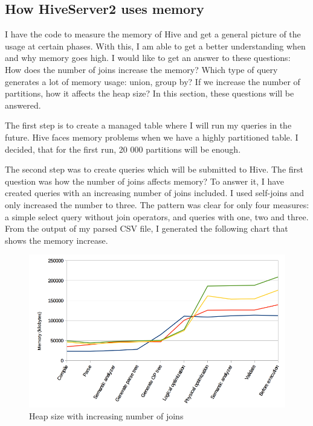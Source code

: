 \subsection{How HiveServer2 uses memory}
I have the code to measure the memory of Hive and get a general picture of the usage at certain phases. With this, I am able to get a better understanding when and why memory goes high. I would like to get an answer to these questions: How does the number of joins increase the memory? Which type of query generates a lot of memory usage: union, group by? If we increase the number of partitions, how it affects the heap size? In this section, these questions will be answered.

The first step is to create a managed table where I will run my queries in the future. Hive faces memory problems when we have a highly partitioned table. I decided, that for the first run, 20 000 partitions will be enough. 

The second step was to create queries which will be submitted to Hive. The first question was how the number of joins affects memory? To answer it, I have created queries with an increasing number of joins included. I used self-joins and only increased the number to three. The pattern was clear for only four measures: a simple select query without join operators, and queries with one, two and three. From the output of my parsed CSV file, I generated the following chart that shows the memory increase.

\begin{figure}[H]
	\includegraphics[width=150mm, keepaspectratio]{figures/hs2_joins_memory.png}
	\centering
	\caption{Heap size with increasing number of joins}
\end{figure}

